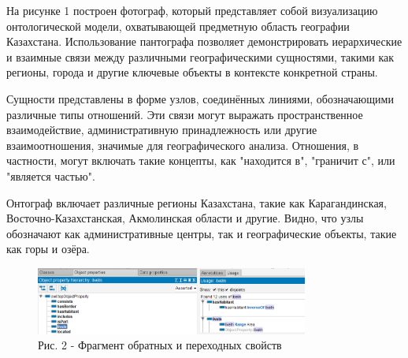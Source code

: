 \begin{multicols}{2}
На рисунке 1 построен фотограф, который представляет собой визуализацию
онтологической модели, охватывающей предметную область географии
Казахстана. Использование пантографа позволяет демонстрировать
иерархические и взаимные связи между различными географическими
сущностями, такими как регионы, города и другие ключевые объекты в
контексте конкретной страны.

Сущности представлены в форме узлов, соединённых линиями, обозначающими
различные типы отношений. Эти связи могут выражать пространственное
взаимодействие, административную принадлежность или другие
взаимоотношения, значимые для географического анализа. Отношения, в
частности, могут включать такие концепты, как "находится в", "граничит
с", или "является частью".

Онтограф включает различные регионы Казахстана, такие как
Карагандинская, Восточно-Казахстанская, Акмолинская области и другие.
Видно, что узлы обозначают как административные центры, так и
географические объекты, такие как горы и озёра.
\end{multicols}

\begin{figure}[H]
	\centering
	\includegraphics[width=0.8\textwidth]{assets/39}
	\caption*{Рис. 2 - Фрагмент обратных и переходных свойств}
\end{figure}

